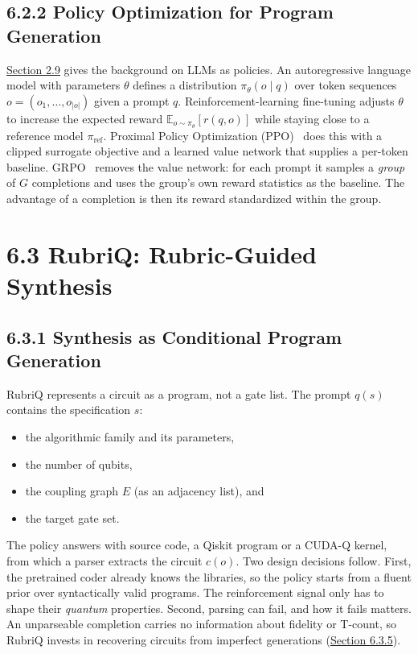 \documentclass{report}
\theoremstyle{plain}
\theoremstyle{definition}
\theoremstyle{remark}
\begin{document}
\subsection{6.2.2 Policy Optimization for Program Generation}\label{sec:syn:po}

\hyperref[sec:bg:llm]{Section 2.9} gives the background on LLMs as policies. An autoregressive language model with parameters $\theta$ defines a distribution $\pi_\theta(o\mid q)$ over token sequences $o=(o_1,\dots,o_{|o|})$ given a prompt $q$. Reinforcement-learning fine-tuning adjusts $\theta$ to increase the expected reward $\mathbb{E}_{o\sim\pi_\theta}[r(q,o)]$ while staying close to a reference model $\pi_{\mathrm{ref}}$. Proximal Policy Optimization (PPO)~\cite{schulman2017ppo} does this with a clipped surrogate objective and a learned value network that supplies a per-token baseline. GRPO~\cite{shao2024deepseekmath} removes the value network: for each prompt it samples a \emph{group} of $G$ completions and uses the group's own reward statistics as the baseline. The advantage of a completion is then its reward standardized within the group.

\section{6.3 RubriQ: Rubric-Guided Synthesis}\label{sec:syn:rubriq}

\subsection{6.3.1 Synthesis as Conditional Program Generation}\label{sec:syn:formulation}

RubriQ represents a circuit as a program, not a gate list. The prompt $q(s)$ contains the specification $s$:
\begin{itemize}
  \item the algorithmic family and its parameters,
  \item the number of qubits,
  \item the coupling graph $E$ (as an adjacency list), and
  \item the target gate set.
\end{itemize}
The policy answers with source code, a Qiskit program or a CUDA-Q kernel, from which a parser extracts the circuit $c(o)$. Two design decisions follow. First, the pretrained coder already knows the libraries, so the policy starts from a fluent prior over syntactically valid programs. The reinforcement signal only has to shape their \emph{quantum} properties. Second, parsing can fail, and how it fails matters. An unparseable completion carries no information about fidelity or T-count, so RubriQ invests in recovering circuits from imperfect generations (\hyperref[sec:syn:parsing]{Section 6.3.5}).
\end{document}
